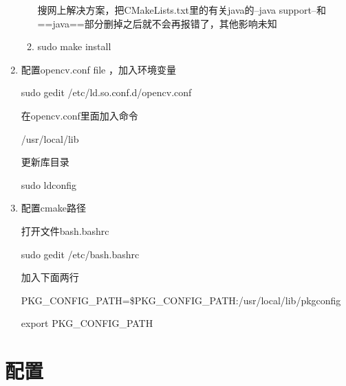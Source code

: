 \documentclass[12pt]{article}
\begin{document}
\begin{enumerate}
\begin{enumerate}
搜网上解决方案，把CMakeLists.txt里的有关java的--java support--和==java==部分删掉之后就不会再报错了，其他影响未知

\item sudo make install

\end{enumerate}

\item 配置opencv.conf file ，加入环境变量  

sudo gedit /etc/ld.so.conf.d/opencv.conf

在opencv.conf里面加入命令

/usr/local/lib

更新库目录

sudo ldconfig

\item 配置cmake路径

打开文件bash.bashrc  

sudo gedit /etc/bash.bashrc

加入下面两行

PKG\_CONFIG\_PATH=\$PKG\_CONFIG\_PATH:/usr/local/lib/pkgconfig

export PKG\_CONFIG\_PATH\

\end{enumerate}

\section{配置}
\end{document}
